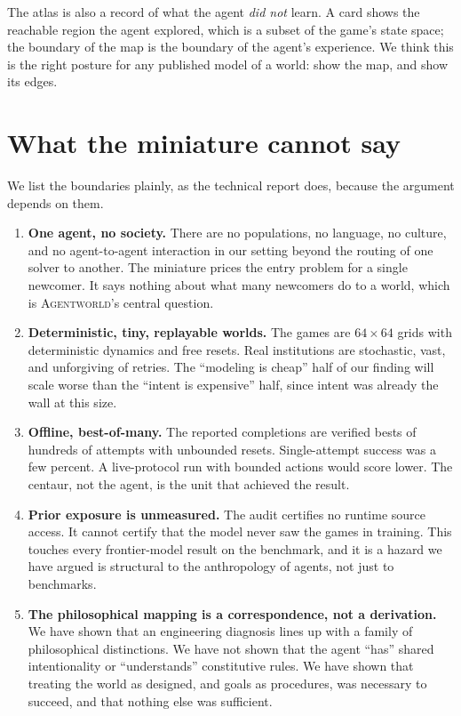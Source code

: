 \documentclass[11pt]{article}
\newcommand{\agentworld}{\textsc{Agentworld}}
\begin{document}
The atlas is also a record of what the agent \emph{did not} learn. A card shows the reachable region the
agent explored, which is a subset of the game's state space; the boundary of the map is the boundary of
the agent's experience. We think this is the right posture for any published model of a world: show the
map, and show its edges.

\section{What the miniature cannot say}
\label{sec:limits}

We list the boundaries plainly, as the technical report does, because the argument depends on them.

\begin{enumerate}\setlength{\itemsep}{2pt}
\item \textbf{One agent, no society.} There are no populations, no language, no culture, and no
agent-to-agent interaction in our setting beyond the routing of one solver to another. The miniature
prices the entry problem for a single newcomer. It says nothing about what many newcomers do to a world,
which is \agentworld{}'s central question.
\item \textbf{Deterministic, tiny, replayable worlds.} The games are $64\times64$ grids with
deterministic dynamics and free resets. Real institutions are stochastic, vast, and unforgiving of
retries. The ``modeling is cheap'' half of our finding will scale worse than the ``intent is expensive''
half, since intent was already the wall at this size.
\item \textbf{Offline, best-of-many.} The reported completions are verified bests of hundreds of
attempts with unbounded resets. Single-attempt success was a few percent. A live-protocol run with
bounded actions would score lower. The centaur, not the agent, is the unit that achieved the result.
\item \textbf{Prior exposure is unmeasured.} The audit certifies no runtime source access. It cannot
certify that the model never saw the games in training. This touches every frontier-model result on the
benchmark, and it is a hazard we have argued is structural to the anthropology of agents, not just to
benchmarks.
\item \textbf{The philosophical mapping is a correspondence, not a derivation.} We have shown that an
engineering diagnosis lines up with a family of philosophical distinctions. We have not shown that the
agent ``has'' shared intentionality or ``understands'' constitutive rules. We have shown that treating
the world as designed, and goals as procedures, was necessary to succeed, and that nothing else was
sufficient.
\end{enumerate}
\end{document}
